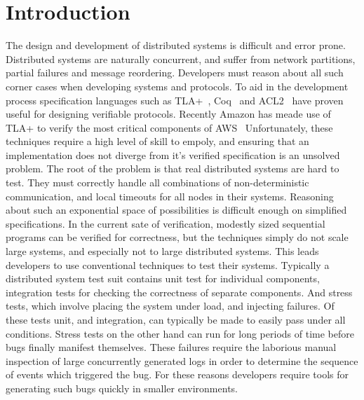 \section{Introduction}
\label{sec:intro}

The design and development of distributed systems is difficult and error prone.
Distributed systems are naturally concurrent, and suffer from network
partitions, partial failures and message reordering. Developers must reason
about all such corner cases when developing systems and protocols. To aid in
the development process specification languages such as
TLA+~\cite{Lamport:1993:HST:646874.709976}, Coq~\cite{WilcoxWPTWEA2015} and
ACL2~\cite{588534} have proven useful for designing verifiable protocols.
Recently Amazon has meade use of TLA+ to verify the most critical components of
AWS~\cite{Newcombe:2015:AWS:2749359.2699417} Unfortunately, these techniques
require a high level of skill to empoly, and ensuring that an implementation
does not diverge from it's verified specification is an unsolved problem. The
root of the problem is that real distributed systems are hard to test. They
must correctly handle all combinations of non-deterministic communication, and
local timeouts for all nodes in their systems. Reasoning about such an
exponential space of possibilities is difficult enough on simplified
specifications. In the current sate of verification, modestly sized sequential
programs can be verified for correctness, but the techniques simply do not
scale large systems, and especially not to large distributed systems. This
leads developers to use conventional techniques to test their systems.
Typically a distributed system test suit contains unit test for individual
components, integration tests for checking the correctness of separate
components. And stress tests, which involve placing the system under load, and
injecting failures. Of these tests unit, and integration, can typically be made
to easily pass under all conditions. Stress tests on the other hand can run for
long periods of time before bugs finally manifest themselves.  These failures
require the laborious manual inspection of large concurrently generated logs in
order to determine the sequence of events which triggered the bug. For these
reasons developers require tools for generating such bugs quickly in smaller
environments. 

